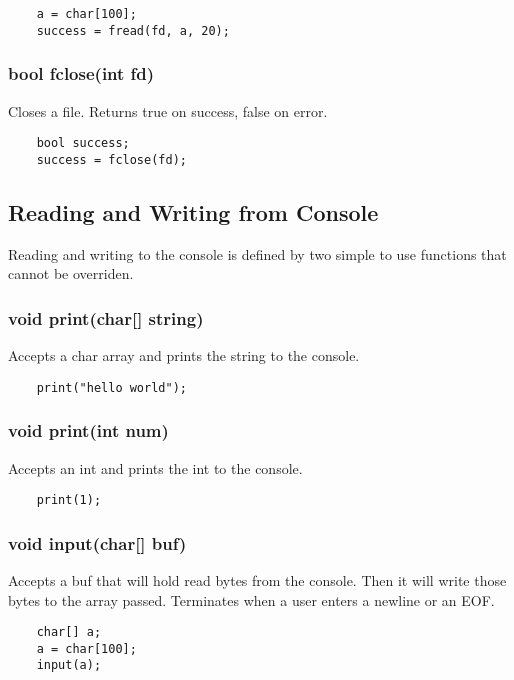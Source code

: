 \begin{homeworkProblem}
\begin{verbatim}
	a = char[100];
	success = fread(fd, a, 20);
	\end{verbatim}
	
	\subsubsection{bool fclose(int fd)}
	Closes a file. Returns true on success, false on error.
	\begin{verbatim} 
	bool success;
	success = fclose(fd);
	\end{verbatim}
	
	\subsection{Reading and Writing from Console}
	
	Reading and writing to the console is defined by two simple to use functions that cannot be overriden.
	
	\subsubsection{void print(char[] string)}
	Accepts a char array and prints the string to the console.
	\begin{verbatim} 
	print("hello world");
	\end{verbatim}
	
	\subsubsection{void print(int num)}
	Accepts an int and prints the int to the console.
	\begin{verbatim} 
	print(1);
	\end{verbatim}
	
	\subsubsection{void input(char[] buf)}
	Accepts a buf that will hold read bytes from the console. Then it will write those bytes to the array passed. Terminates when a user enters a newline or an EOF. 
	\begin{verbatim} 
	char[] a;
	a = char[100];
	input(a);
	\end{verbatim}
	
\end{homeworkProblem}
